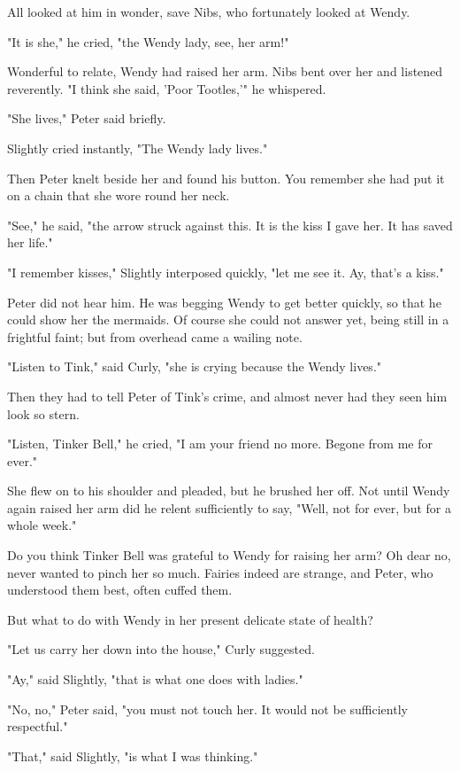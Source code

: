 All looked at him in wonder, save Nibs, who fortunately looked at Wendy.


"It is she," he cried, "the Wendy lady, see, her arm!"


Wonderful to relate, Wendy had raised her arm. Nibs bent over her
and listened reverently. "I think she said, 'Poor Tootles,'" he whispered.


"She lives," Peter said briefly.


Slightly cried instantly, "The Wendy lady lives."


Then Peter knelt beside her and found his button. You remember she had put
it on a chain that she wore round her neck.


"See," he said, "the arrow struck against this. It is the kiss I gave her.
It has saved her life."


"I remember kisses," Slightly interposed quickly, "let me see it. Ay,
that's a kiss."


Peter did not hear him. He was begging Wendy to get better quickly, so
that he could show her the mermaids. Of course she could not answer yet,
being still in a frightful faint; but from overhead came a wailing note.


"Listen to Tink," said Curly, "she is crying because the Wendy lives."


Then they had to tell Peter of Tink's crime, and almost never had they
seen him look so stern.


"Listen, Tinker Bell," he cried, "I am your friend no more. Begone from me
for ever."


She flew on to his shoulder and pleaded, but he brushed her off. Not until
Wendy again raised her arm did he relent sufficiently to say, "Well, not
for ever, but for a whole week."


Do you think Tinker Bell was grateful to Wendy for raising her arm? Oh
dear no, never wanted to pinch her so much. Fairies indeed are strange,
and Peter, who understood them best, often cuffed them.


But what to do with Wendy in her present delicate state of health?


"Let us carry her down into the house," Curly suggested.


"Ay," said Slightly, "that is what one does with ladies."


"No, no," Peter said, "you must not touch her. It would not be
sufficiently respectful."


"That," said Slightly, "is what I was thinking."


